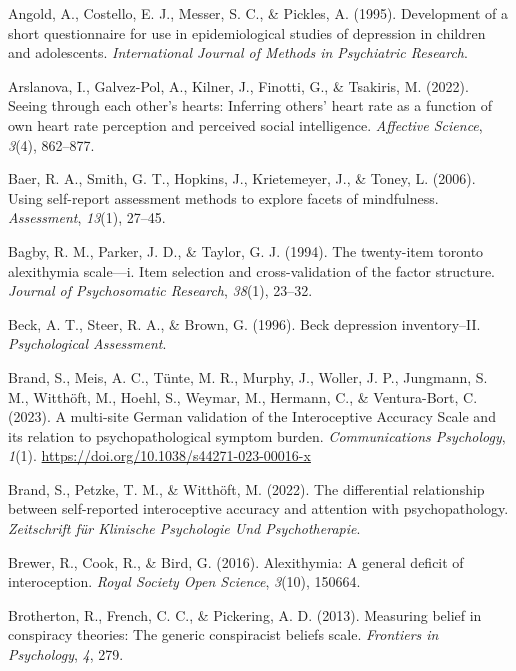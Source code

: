 \documentclass[
  jou,
  floatsintext,
  longtable,
  nolmodern,
  notxfonts,
  notimes,
  colorlinks=true,linkcolor=blue,citecolor=blue,urlcolor=blue]{apa7}
\newlength{\cslhangindent}
\newenvironment{CSLReferences}[2] %
 {\begin{list}{}{%
  \setlength{\itemindent}{0pt}
  \setlength{\leftmargin}{0pt}
  \setlength{\parsep}{0pt}
  \ifodd #1
   \setlength{\leftmargin}{\cslhangindent}
   \setlength{\itemindent}{-1\cslhangindent}
  \fi
  \setlength{\itemsep}{#2\baselineskip}}}
 {\end{list}}
\begin{document}
\label{refs}
\begin{CSLReferences}{1}{0}
Angold, A., Costello, E. J., Messer, S. C., \& Pickles, A. (1995).
Development of a short questionnaire for use in epidemiological studies
of depression in children and adolescents. \emph{International Journal
of Methods in Psychiatric Research}.

Arslanova, I., Galvez-Pol, A., Kilner, J., Finotti, G., \& Tsakiris, M.
(2022). Seeing through each other's hearts: Inferring others' heart rate
as a function of own heart rate perception and perceived social
intelligence. \emph{Affective Science}, \emph{3}(4), 862--877.

Baer, R. A., Smith, G. T., Hopkins, J., Krietemeyer, J., \& Toney, L.
(2006). Using self-report assessment methods to explore facets of
mindfulness. \emph{Assessment}, \emph{13}(1), 27--45.

Bagby, R. M., Parker, J. D., \& Taylor, G. J. (1994). The twenty-item
toronto alexithymia scale---i. Item selection and cross-validation of
the factor structure. \emph{Journal of Psychosomatic Research},
\emph{38}(1), 23--32.

Beck, A. T., Steer, R. A., \& Brown, G. (1996). Beck depression
inventory--II. \emph{Psychological Assessment}.

Brand, S., Meis, A. C., Tünte, M. R., Murphy, J., Woller, J. P.,
Jungmann, S. M., Witthöft, M., Hoehl, S., Weymar, M., Hermann, C., \&
Ventura-Bort, C. (2023). A multi-site German validation of the
Interoceptive Accuracy Scale and its relation to psychopathological
symptom burden. \emph{Communications Psychology}, \emph{1}(1).
\url{https://doi.org/10.1038/s44271-023-00016-x}

Brand, S., Petzke, T. M., \& Witthöft, M. (2022). The differential
relationship between self-reported interoceptive accuracy and attention
with psychopathology. \emph{Zeitschrift f{ü}r Klinische Psychologie Und
Psychotherapie}.

Brewer, R., Cook, R., \& Bird, G. (2016). Alexithymia: A general deficit
of interoception. \emph{Royal Society Open Science}, \emph{3}(10),
150664.

Brotherton, R., French, C. C., \& Pickering, A. D. (2013). Measuring
belief in conspiracy theories: The generic conspiracist beliefs scale.
\emph{Frontiers in Psychology}, \emph{4}, 279.


\end{CSLReferences}
\end{document}
